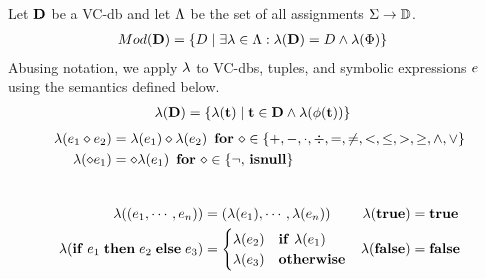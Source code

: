 \begin{defi}[$\worldsOf{\vcdb}$]\label{def:vcdb-worlds}
  Let $\mathbf{D}$ be a VC-db and let $\Lambda$ be the set of all assignments $\Sigma \to \mathbb{D}$.
  \begin{align*}
Mod({\mathbf{D}}) &= \{ D \mid \exists \lambda \in \Lambda: \lambda(\mathbf{D}) = D \land \lambda(\Phi)\}
  \end{align*}
Abusing notation, we apply $\lambda$ to VC-dbs, tuples, and symbolic expressions $e$ using the semantics defined below.
  \begin{align*}
\lambda(\mathbf{D}) &= \{ \lambda(\mathbf{t}) \mid \mathbf{t} \in \mathbf{D} \land \lambda(\phi(\mathbf{t})) \}
  \end{align*}
  \begin{align*}
        \lambda(e_1 \diamond e_2) &= \lambda(e_1) \diamond \lambda(e_2) \,\,\,\text{\textbf{for}}\,\, \diamond \in \{+,-,\cdot,\div,=,\neq,<,\leq,>,\geq,\land,\lor\}\\
        \lambda(\diamond e_1) &= \diamond \lambda(e_1)
    \,\,\,\text{\textbf{for}}\,\, \diamond \in \{\neg, \,\mathbf{isnull}\}
  \end{align*}\\[-9mm]
  \begin{align*}
    \lambda( (e_1, \cdots, e_n)) &= (\lambda(e_1), \cdots, \lambda(e_n))     &\lambda(\mathbf{true}) &= \mathbf{true}  \\
        \lambda(\mathbf{if}\thickspace e_1 \thickspace \mathbf{then} \thickspace e_2 \thickspace \mathbf{else} \thickspace e_3) &=
                                          \begin{cases}
                                            \lambda(e_2) &\mathbf{if}\,\,\lambda(e_1)\\
                                            \lambda(e_3) &\mathbf{otherwise}\\
                                          \end{cases}
    &\lambda(\mathbf{false}) &= \mathbf{false}\\
  \end{align*}


\end{defi}


